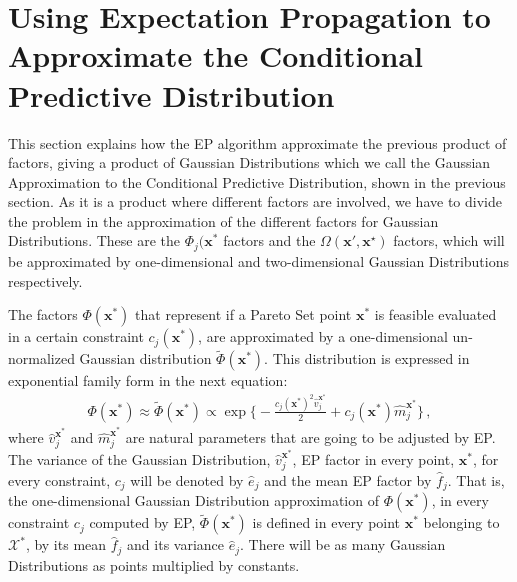 \section{Using Expectation Propagation to Approximate the Conditional Predictive Distribution}

This section explains how the EP algorithm approximate the previous product of factors, giving a product of Gaussian Distributions which we call the Gaussian Approximation to the Conditional Predictive Distribution, shown in the previous section. As it is a product where different factors are involved, we have to divide the problem in the approximation of the different factors for Gaussian Distributions. These are the $\Phi_j(\boldsymbol{x}^*$ factors and the $\Omega(\textbf{x}',\textbf{x}^{\star})$ factors, which will be approximated by one-dimensional and two-dimensional Gaussian Distributions respectively.

The factors $\Phi(\boldsymbol{x}^*)$ that represent if a Pareto Set point $\boldsymbol{x}^*$ is feasible evaluated in a certain constraint $c_j(\boldsymbol{x}^*)$, are approximated by a one-dimensional un-normalized Gaussian distribution $\tilde{\Phi}(\boldsymbol{x}^*)$. This distribution is expressed in exponential family form in the next equation:
\begin{align}
    \Phi(\boldsymbol{x}^*) \approx \tilde{\Phi}(\boldsymbol{x}^*) \propto \exp\bigg\{ - \frac{c_j(\boldsymbol{x}^{*})^{2}\hat{v}_{j}^{\boldsymbol{x}^{*}}}{2} + c_j(\boldsymbol{x}^*)\hat{m}_{j}^{\boldsymbol{x}^*}\bigg\}\,,
\end{align}
where $\hat{v}_{j}^{\boldsymbol{x}^{*}}$ and $\hat{m}_{j}^{\boldsymbol{x}^*}$ are natural parameters that are going to be adjusted by EP. The variance of the Gaussian Distribution, $\hat{v}_{j}^{\boldsymbol{x}^{*}}$, EP factor in every point, $\boldsymbol{x}^*$, for every constraint, $c_j$ will be denoted by $\hat{e}_{j}$ and the mean EP factor by $\hat{f}_{j}$. That is, the one-dimensional Gaussian Distribution approximation of ${\Phi}(\boldsymbol{x}^*)$, in every constraint $c_j$ computed by EP, $\tilde{\Phi}(\boldsymbol{x}^*)$ is defined in every point $\boldsymbol{x}^*$ belonging to $\mathcal{X}^*$, by its mean $\hat{f}_{j}$ and its variance $\hat{e}_{j}$. There will be as many Gaussian Distributions as points multiplied by constants.

